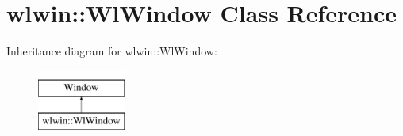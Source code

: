 \hypertarget{classwlwin_1_1WlWindow}{}\section{wlwin\+::Wl\+Window Class Reference}
\label{classwlwin_1_1WlWindow}
Inheritance diagram for wlwin\+::Wl\+Window\+:\begin{figure}[H]
\begin{center}
\leavevmode
\includegraphics[height=2.000000cm]{classwlwin_1_1WlWindow}
\end{center}
\end{figure}
